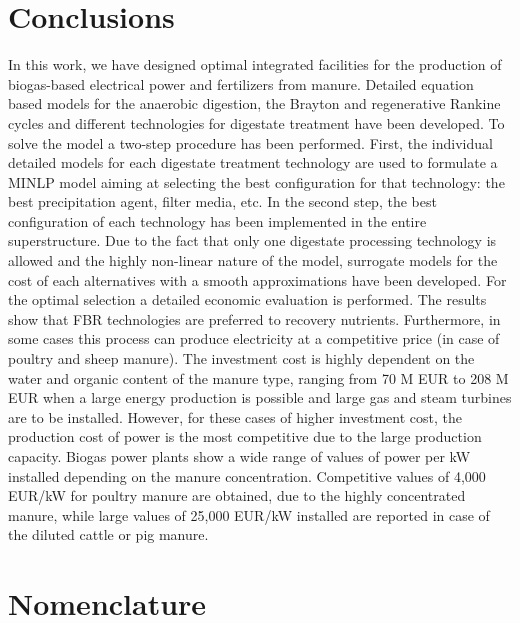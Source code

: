 \begin{refsection}[referencesCh2]
\section{Conclusions} \label{section:Conclusions}
In this work, we have designed optimal integrated facilities for the production of biogas-based electrical power and fertilizers from manure. Detailed equation based models for the anaerobic digestion, the Brayton and regenerative Rankine cycles and different technologies for digestate treatment have been developed. To solve the model a two-step procedure has been performed. First, the individual detailed models for each digestate treatment technology are used to formulate a MINLP model aiming at selecting the best configuration for that technology: the best precipitation agent, filter media, etc. In the second step, the best configuration of each technology has been implemented in the entire superstructure. Due to the fact that only one digestate processing technology is allowed and the highly non-linear nature of the model, surrogate models for the cost of each alternatives with a smooth approximations have been developed. For the optimal selection a detailed economic evaluation is performed. The results show that FBR technologies are preferred to recovery nutrients. Furthermore, in some cases this process can produce electricity at a competitive price (in case of poultry and sheep manure). The investment cost is highly dependent on the water and organic content of the manure type, ranging from 70 M EUR to 208 M EUR when a large energy production is possible and large gas and steam turbines are to be installed. However, for these cases of higher investment cost, the production cost of power is the most competitive due to the large production capacity. Biogas power plants show a wide range of values of power
per kW installed depending on the manure concentration. Competitive values of 4,000 EUR/kW for poultry manure are obtained, due to the highly concentrated manure, while large values of 25,000 EUR/kW installed are reported in case of the diluted cattle or pig manure.


\section*{Nomenclature}


\end{refsection}
